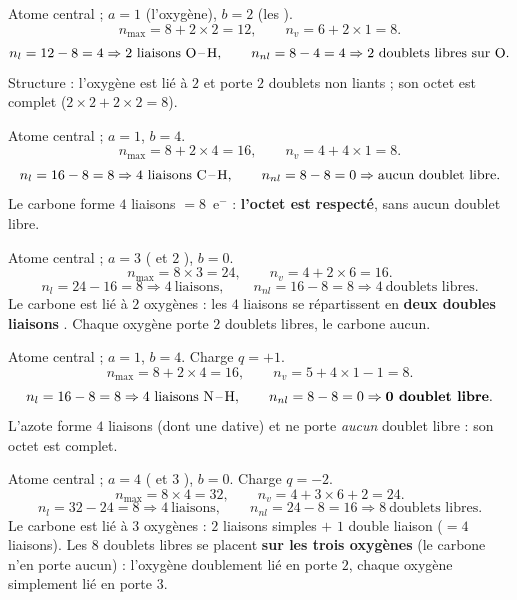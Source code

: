 \documentclass[11pt,a4paper]{article}
\begin{document}
\begin{corrige}[l'eau \ce{H2O}]
Atome central  ; $a=1$ (l'oxygène), $b=2$ (les ).
\[ n_{\max} = 8 + 2\times 2 = 12,\qquad n_v = 6 + 2\times 1 = 8. \]
\[ n_l = 12 - 8 = 4 \Rightarrow 2\ \text{liaisons \ce{O-H}},\qquad
   n_{nl} = 8 - 4 = 4 \Rightarrow 2\ \text{doublets libres sur \ce{O}}. \]
Structure : l'oxygène est lié à $2$  et porte $2$ doublets non liants ; son octet est
complet ($2\times2 + 2\times2 = 8$).
\end{corrige}

\begin{corrige}[le méthane \ce{CH4}]
Atome central  ; $a=1$, $b=4$.
\[ n_{\max} = 8 + 2\times 4 = 16,\qquad n_v = 4 + 4\times 1 = 8. \]
\[ n_l = 16 - 8 = 8 \Rightarrow 4\ \text{liaisons \ce{C-H}},\qquad
   n_{nl} = 8 - 8 = 0 \Rightarrow \text{aucun doublet libre}. \]
Le carbone forme $4$ liaisons $= 8$~e$^-$ : \textbf{l'octet est respecté}, sans aucun doublet
libre.
\end{corrige}

\begin{corrige}
Atome central  ; $a=3$ ( et $2$ ), $b=0$.
\[ n_{\max} = 8\times 3 = 24,\qquad n_v = 4 + 2\times 6 = 16. \]
\[ n_l = 24 - 16 = 8 \Rightarrow 4\ \text{liaisons},\qquad
   n_{nl} = 16 - 8 = 8 \Rightarrow 4\ \text{doublets libres}. \]
Le carbone est lié à $2$ oxygènes : les $4$ liaisons se répartissent en \textbf{deux doubles
liaisons} . Chaque oxygène porte $2$ doublets libres, le carbone aucun.
\end{corrige}

\begin{corrige}
Atome central  ; $a=1$, $b=4$. Charge $q=+1$.
\[ n_{\max} = 8 + 2\times 4 = 16,\qquad n_v = 5 + 4\times 1 - 1 = 8. \]
\[ n_l = 16 - 8 = 8 \Rightarrow 4\ \text{liaisons \ce{N-H}},\qquad
   n_{nl} = 8 - 8 = 0 \Rightarrow \textbf{0 doublet libre}. \]
L'azote forme $4$ liaisons (dont une dative) et ne porte \emph{aucun} doublet libre : son octet
est complet.
\end{corrige}

\begin{corrige}
Atome central  ; $a=4$ ( et $3$ ), $b=0$. Charge $q=-2$.
\[ n_{\max} = 8\times 4 = 32,\qquad n_v = 4 + 3\times 6 + 2 = 24. \]
\[ n_l = 32 - 24 = 8 \Rightarrow 4\ \text{liaisons},\qquad
   n_{nl} = 24 - 8 = 16 \Rightarrow 8\ \text{doublets libres}. \]
Le carbone est lié à $3$ oxygènes : $2$ liaisons simples $+$ $1$ double liaison ($=4$ liaisons).
Les $8$ doublets libres se placent \textbf{sur les trois oxygènes} (le carbone n'en porte aucun) :
l'oxygène doublement lié en porte $2$, chaque oxygène simplement lié en porte $3$.
\end{corrige}
\end{document}
